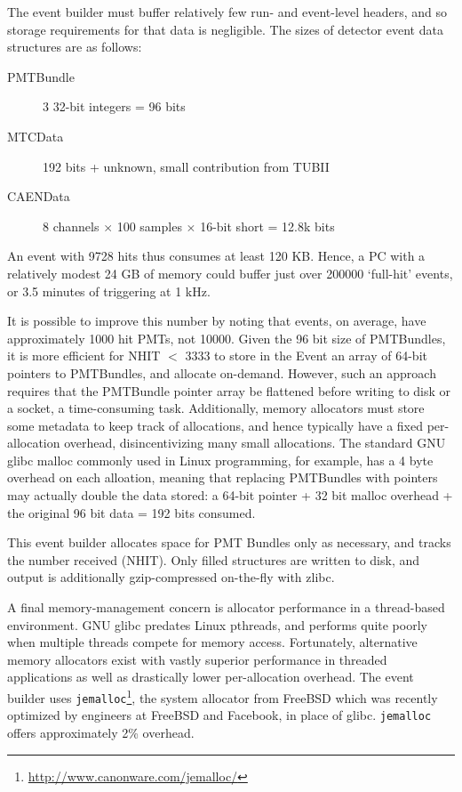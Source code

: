 \documentclass[11pt,twocolumn]{article}
\begin{document}
The event builder must buffer relatively few run- and event-level headers, and so storage requirements for that data is negligible. The sizes of detector event data structures are as follows:
\begin{description}
\item[PMTBundle] 3 32-bit integers = 96 bits
\item[MTCData] 192 bits + unknown, small contribution from TUBII
\item[CAENData] 8 channels $\times$ 100 samples $\times$ 16-bit short = 12.8k bits
\end{description}
An event with 9728 hits thus consumes at least 120 KB. Hence, a PC with a relatively modest 24 GB of memory could buffer just over 200000 `full-hit' events, or 3.5 minutes of triggering at 1 kHz.

It is possible to improve this number by noting that events, on average, have approximately 1000 hit PMTs, not 10000. Given the 96 bit size of PMTBundles, it is more efficient for NHIT $<$ 3333 to store in the Event an array of 64-bit pointers to PMTBundles, and allocate on-demand. However, such an approach requires that the PMTBundle pointer array be flattened before writing to disk or a socket, a time-consuming task. Additionally, memory allocators must store some metadata to keep track of allocations, and hence typically have a fixed per-allocation overhead, disincentivizing many small allocations. The standard GNU glibc malloc commonly used in Linux programming, for example, has a 4 byte overhead on each alloation, meaning that replacing PMTBundles with pointers may actually double the data stored: a 64-bit pointer + 32 bit malloc overhead + the original 96 bit data = 192 bits consumed.

This event builder allocates space for PMT Bundles only as necessary, and tracks the number received (NHIT). Only filled structures are written to disk, and output is additionally gzip-compressed on-the-fly with zlibc.

A final memory-management concern is allocator performance in a thread-based environment. GNU glibc predates Linux pthreads, and performs quite poorly when multiple threads compete for memory access. Fortunately, alternative memory allocators exist with vastly superior performance in threaded applications as well as drastically lower per-allocation overhead. The event builder uses {\tt jemalloc}\footnote{\href{http://www.canonware.com/jemalloc/}{http://www.canonware.com/jemalloc/}}, the system allocator from FreeBSD which was recently optimized by engineers at FreeBSD and Facebook, in place of glibc. {\tt jemalloc} offers approximately 2\% overhead.
\end{document}
